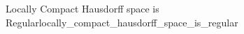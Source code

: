 \begin{proposition}{Locally Compact Hausdorff space is
Regular}{locally_compact_hausdorff_space_is_regular}

\end{proposition}
